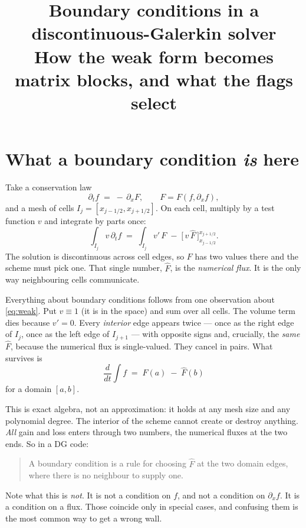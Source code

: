 \documentclass[11pt]{article}
\title{\vspace{-2em}Boundary conditions in a discontinuous-Galerkin solver\\
\large How the weak form becomes matrix blocks, and what the flags select}
\author{}
\date{}
\begin{document}
\maketitle
\vspace{-3em}

\section{What a boundary condition \emph{is} here}

Take a conservation law
\[
  \partial_t f \;=\; -\,\partial_x F , \qquad F = F(f,\partial_x f),
\]
and a mesh of cells $I_j=[x_{j-1/2},x_{j+1/2}]$. On each cell, multiply by a test
function $v$ and integrate by parts once:
\begin{equation}
  \int_{I_j} v\,\partial_t f
  \;=\; \int_{I_j} v'\,F
  \;-\;\Big[\,v\,\widehat F\,\Big]_{x_{j-1/2}}^{x_{j+1/2}} .
  \label{eq:weak}
\end{equation}
The solution is discontinuous across cell edges, so $F$ has two values there and
the scheme must pick one. That single number, $\widehat F$, is the
\emph{numerical flux}. It is the only way neighbouring cells communicate.

Everything about boundary conditions follows from one observation about
\eqref{eq:weak}. Put $v\equiv 1$ (it is in the space) and sum over all cells.
The volume term dies because $v'=0$. Every \emph{interior} edge appears twice ---
once as the right edge of $I_j$, once as the left edge of $I_{j+1}$ --- with
opposite signs and, crucially, the \emph{same} $\widehat F$, because the numerical
flux is single-valued. They cancel in pairs. What survives is
\begin{equation}
  \frac{d}{dt}\int f \;=\; \widehat F(a) \;-\; \widehat F(b)
  \label{eq:ledger}
\end{equation}
for a domain $[a,b]$.

This is exact algebra, not an approximation: it holds at any mesh size and any
polynomial degree. The interior of the scheme cannot create or destroy anything.
\emph{All} gain and loss enters through two numbers, the numerical fluxes at the
two ends. So in a DG code:

\begin{quote}
  A boundary condition is a rule for choosing $\widehat F$ at the two domain
  edges, where there is no neighbour to supply one.
\end{quote}

Note what this is \emph{not}. It is not a condition on $f$, and not a condition
on $\partial_x f$. It is a condition on a flux. Those coincide only in special
cases, and confusing them is the most common way to get a wrong wall.
\end{document}
